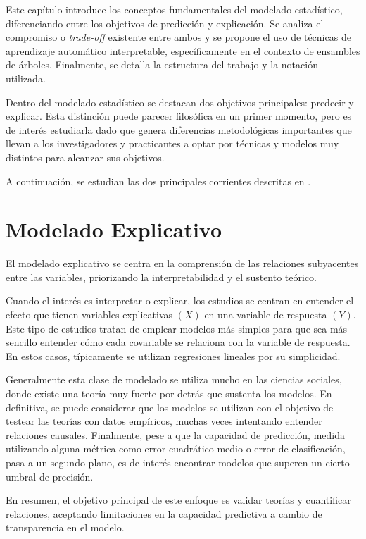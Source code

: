 Este capítulo introduce los conceptos fundamentales del modelado estadístico, diferenciando entre los objetivos de predicción y explicación. Se analiza el compromiso o \textit{trade-off} existente entre ambos y se propone el uso de técnicas de aprendizaje automático interpretable, específicamente en el contexto de ensambles de árboles. Finalmente, se detalla la estructura del trabajo y la notación utilizada.

Dentro del modelado estadístico se destacan dos objetivos principales: predecir y explicar. Esta distinción puede parecer filosófica en un primer momento, pero es de interés estudiarla dado que genera diferencias metodológicas importantes que llevan a los investigadores y practicantes a optar por técnicas y modelos muy distintos para alcanzar sus objetivos.

A continuación, se estudian las dos principales corrientes descritas en \cite{to_explain_or_to_predict}.

\section{Modelado Explicativo}

El modelado explicativo se centra en la comprensión de las relaciones subyacentes entre las variables, priorizando la interpretabilidad y el sustento teórico.

Cuando el interés es interpretar o explicar, los estudios se centran en entender el efecto que tienen variables explicativas $(X)$ en una variable de respuesta $(Y)$. Este tipo de estudios tratan de emplear modelos más simples para que sea más sencillo entender cómo cada covariable se relaciona con la variable de respuesta. En estos casos, típicamente se utilizan regresiones lineales por su simplicidad.

Generalmente esta clase de modelado se utiliza mucho en las ciencias sociales, donde existe una teoría muy fuerte por detrás que sustenta los modelos. En definitiva, se puede considerar que los modelos se utilizan con el objetivo de testear las teorías con datos empíricos, muchas veces intentando entender relaciones causales. Finalmente, pese a que la capacidad de predicción, medida utilizando alguna métrica como error cuadrático medio o error de clasificación, pasa a un segundo plano, es de interés encontrar modelos que superen un cierto umbral de precisión.

En resumen, el objetivo principal de este enfoque es validar teorías y cuantificar relaciones, aceptando limitaciones en la capacidad predictiva a cambio de transparencia en el modelo.

